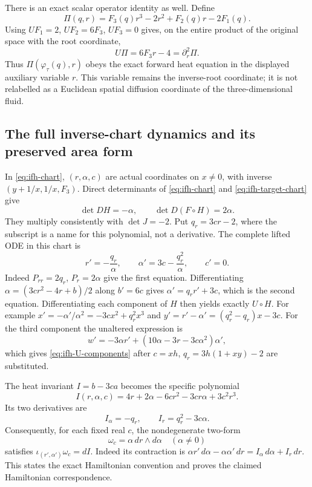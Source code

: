 There is an exact scalar operator identity as well. Define
\[
 \Pi(q,r)=F_3(q)r^3-2r^2+F_2(q)r-2F_1(q).
\]
Using $UF_1=2$, $UF_2=6F_3$, $UF_3=0$ gives, on the entire product
of the original space with the root coordinate,
\begin{equation}
 U\Pi=6F_3r-4=\partial_r^2\Pi.
 \label{eq:ifh-scalar-operator}
\end{equation}
Thus $\Pi(\varphi_\tau(q),r)$ obeys the exact forward heat equation
in the displayed auxiliary variable $r$. This variable remains the
inverse-root coordinate; it is not relabelled as a Euclidean spatial
diffusion coordinate of the three-dimensional fluid.

\subsection{The full inverse-chart dynamics and its preserved area form}

In \eqref{eq:ifh-chart}, $(r,\alpha,c)$ are actual coordinates on $x\ne0$,
with inverse $(y+1/x,1/x,F_3)$. Direct determinants of
\eqref{eq:ifh-chart} and \eqref{eq:ifh-target-chart} give
\[
 \det DH=-\alpha,\qquad \det D(F\circ H)=2\alpha.
\]
They multiply consistently with $\det J=-2$.
Put $q_r=3cr-2$, where the subscript is a name for this polynomial,
not a derivative. The complete lifted ODE in this chart is
\begin{equation}
 r'=-\frac{q_r}{\alpha},\qquad
 \alpha'=3c-\frac{q_r^2}{\alpha},\qquad c'=0.
 \label{eq:ifh-root-ode}
\end{equation}
Indeed $P_{rr}=2q_r$, $P_r=2\alpha$ give the first equation.
Differentiating
$\alpha=(3cr^2-4r+b)/2$ along $b'=6c$ gives
$\alpha'=q_r r'+3c$, which is the second equation.
Differentiating each component of $H$ then yields exactly $U\circ H$.
For example
$x'=-\alpha'/\alpha^2=-3cx^2+q_r^2x^3$ and
$y'=r'-\alpha'=(q_r^2-q_r)x-3c$.
For the third component the unaltered expression is
\[
 w'=-3\alpha r'
 +(10\alpha-3r-3c\alpha^2)\alpha',
\]
which gives \eqref{eq:ifh-U-components} after
$c=xh$, $q_r=3h(1+xy)-2$ are substituted.

The heat invariant $I=b-3ca$ becomes the specific polynomial
\[
 I(r,\alpha,c)=4r+2\alpha-6cr^2-3cr\alpha+3c^2r^3.
\]
Its two derivatives are
\[
 I_\alpha=-q_r,\qquad I_r=q_r^2-3c\alpha.
\]
Consequently, for each fixed real $c$, the nondegenerate two-form
\[
 \omega_c=\alpha\,dr\wedge d\alpha\quad(\alpha\ne0)
\]
satisfies
$\iota_{(r',\alpha')}\omega_c=dI$.
Indeed its contraction is
$\alpha r'\,d\alpha-\alpha\alpha'\,dr
 =I_\alpha\,d\alpha+I_r\,dr$.
This states the exact Hamiltonian convention and proves the claimed
Hamiltonian correspondence.


